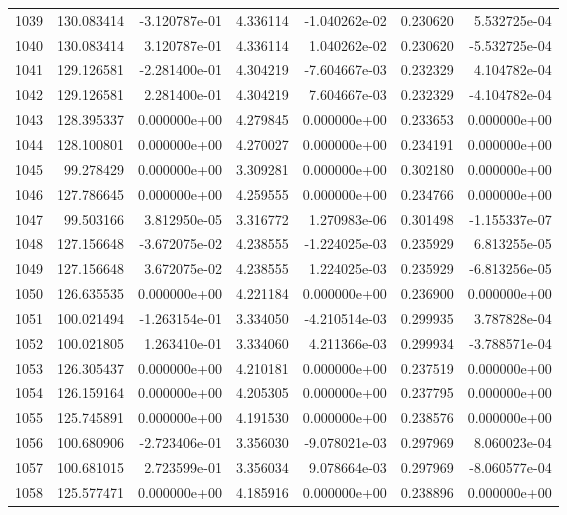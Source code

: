 \begin{tabular}{rrrrrrr}
1039 & 130.083414 & -3.120787e-01 &  4.336114 & -1.040262e-02 &    0.230620 &  5.532725e-04 \\
1040 & 130.083414 &  3.120787e-01 &  4.336114 &  1.040262e-02 &    0.230620 & -5.532725e-04 \\
1041 & 129.126581 & -2.281400e-01 &  4.304219 & -7.604667e-03 &    0.232329 &  4.104782e-04 \\
1042 & 129.126581 &  2.281400e-01 &  4.304219 &  7.604667e-03 &    0.232329 & -4.104782e-04 \\
1043 & 128.395337 &  0.000000e+00 &  4.279845 &  0.000000e+00 &    0.233653 &  0.000000e+00 \\
1044 & 128.100801 &  0.000000e+00 &  4.270027 &  0.000000e+00 &    0.234191 &  0.000000e+00 \\
1045 &  99.278429 &  0.000000e+00 &  3.309281 &  0.000000e+00 &    0.302180 &  0.000000e+00 \\
1046 & 127.786645 &  0.000000e+00 &  4.259555 &  0.000000e+00 &    0.234766 &  0.000000e+00 \\
1047 &  99.503166 &  3.812950e-05 &  3.316772 &  1.270983e-06 &    0.301498 & -1.155337e-07 \\
1048 & 127.156648 & -3.672075e-02 &  4.238555 & -1.224025e-03 &    0.235929 &  6.813255e-05 \\
1049 & 127.156648 &  3.672075e-02 &  4.238555 &  1.224025e-03 &    0.235929 & -6.813256e-05 \\
1050 & 126.635535 &  0.000000e+00 &  4.221184 &  0.000000e+00 &    0.236900 &  0.000000e+00 \\
1051 & 100.021494 & -1.263154e-01 &  3.334050 & -4.210514e-03 &    0.299935 &  3.787828e-04 \\
1052 & 100.021805 &  1.263410e-01 &  3.334060 &  4.211366e-03 &    0.299934 & -3.788571e-04 \\
1053 & 126.305437 &  0.000000e+00 &  4.210181 &  0.000000e+00 &    0.237519 &  0.000000e+00 \\
1054 & 126.159164 &  0.000000e+00 &  4.205305 &  0.000000e+00 &    0.237795 &  0.000000e+00 \\
1055 & 125.745891 &  0.000000e+00 &  4.191530 &  0.000000e+00 &    0.238576 &  0.000000e+00 \\
1056 & 100.680906 & -2.723406e-01 &  3.356030 & -9.078021e-03 &    0.297969 &  8.060023e-04 \\
1057 & 100.681015 &  2.723599e-01 &  3.356034 &  9.078664e-03 &    0.297969 & -8.060577e-04 \\
1058 & 125.577471 &  0.000000e+00 &  4.185916 &  0.000000e+00 &    0.238896 &  0.000000e+00 \\

\end{tabular}
